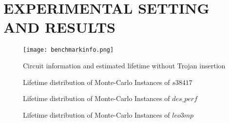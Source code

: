 \section{EXPERIMENTAL SETTING AND RESULTS}
\label{sec:mot}
\begin{figure*}
	\centering
	\texttt{[image: benchmarkinfo.png]}
	\caption{Circuit information and estimated lifetime without Trojan insertion}
	\label{fig:benchmark}
\end{figure*}

\begin{comment}
\begin{figure*}
	\texttt{[image: exp1.png]}
	\caption{Lifetime distribution of s38417 instances when it is attacked to fail at 5 year and 3 year}
	\label{fig:exp1}
\end{figure*}
\begin{figure*}
	\texttt{[image: exp2.png]}
	\caption{Lifetime distribution of des\_perf instances when it is attacked to fail at 5 year and 3 year}
	\label{fig:exp2}
\end{figure*}
\begin{figure*}
	\texttt{[image: exp3.png]}
	\caption{Lifetime distribution of leo3mp instances when it is attacked to fail at 5 year and 3 year}
	\label{fig:exp3}
\end{figure*}
\end{comment}

\begin{figure*}[!ht]
    \centering
    \hspace{0.2cm}
    \caption{Lifetime distribution of Monte-Carlo Instances of $s38417$}
    \label{fig:exp1}
\end{figure*}
\begin{figure*}[!ht]
    \centering
    \hspace{0.2cm}
    \caption{Lifetime distribution of Monte-Carlo Instances of $des\_perf$}
    \label{fig:exp2}
\end{figure*}
\begin{figure*}[!ht]
    \centering
    \hspace{0.2cm}
    \caption{Lifetime distribution of Monte-Carlo Instances of $leo3mp$}
    \label{fig:exp3}
\end{figure*}



